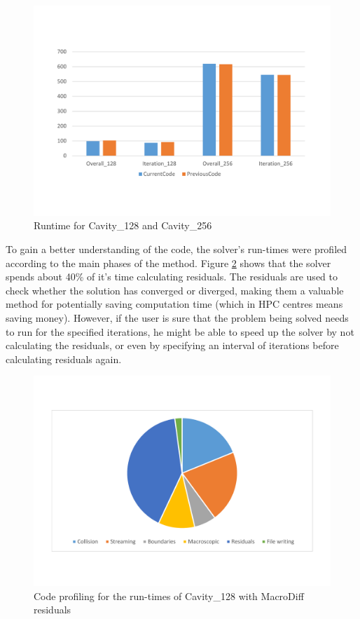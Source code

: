 \documentclass[12pt]{book}
\begin{document}
\begin{figure}[H]
	\centering
	\includegraphics[width=0.9\linewidth]{Resources/Images/compareTimes.pdf}
	\caption{Runtime for Cavity\_128 and Cavity\_256}
	\label{fig:compareTimes}
\end{figure}


To gain a better understanding of the code, the solver’s run-times were profiled according to the main phases of the method. Figure \ref{fig:initialProfiling} shows that the solver spends about 40\% of it’s time calculating residuals. The residuals are used to check whether the solution has converged or diverged, making them a valuable method for potentially saving computation time (which in HPC centres means saving money). However, if the user is sure that the problem being solved needs to run for the specified iterations, he might be able to speed up the solver by not calculating the residuals, or even by specifying an interval of iterations before calculating residuals again.

\begin{figure}[H]
	\centering
	\includegraphics[width=0.9\linewidth]{Resources/Images/initialProfiling.pdf}
	\caption{Code profiling for the run-times of Cavity\_128 with MacroDiff residuals}
	\label{fig:initialProfiling}
\end{figure}
\end{document}
